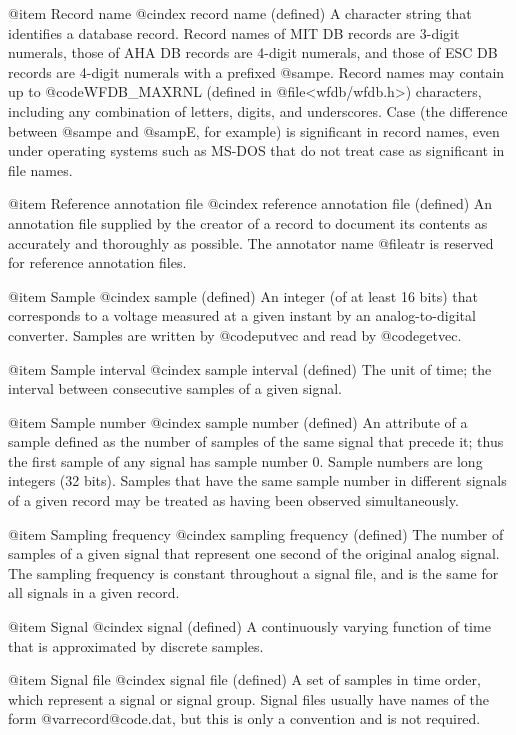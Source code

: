 {{{{{{{{@item Record name
@cindex record name (defined)
A character string that identifies a database record.  Record names of
MIT DB records are 3-digit numerals, those of AHA DB records are 4-digit
numerals, and those of ESC DB records are 4-digit numerals with a
prefixed @samp{e}.  Record names may contain up to @code{WFDB_MAXRNL}
(defined in @file{<wfdb/wfdb.h>}) characters, including any combination of
letters, digits, and underscores.  Case (the difference between @samp{e}
and @samp{E}, for example) is significant in record names, even under
operating systems such as MS-DOS that do not treat case as significant
in file names.

@item Reference annotation file
@cindex reference annotation file (defined)
An annotation file supplied by the creator of a record to document its
contents as accurately and thoroughly as possible.  The annotator name
@file{atr} is reserved for reference annotation files.

@item Sample
@cindex sample (defined)
An integer (of at least 16 bits) that corresponds to a voltage measured
at a given instant by an analog-to-digital converter.  Samples are
written by @code{putvec} and read by @code{getvec}.

@item Sample interval
@cindex sample interval (defined)
The unit of time;  the interval between consecutive samples of a given
signal.

@item Sample number
@cindex sample number (defined)
An attribute of a sample defined as the number of samples of the same
signal that precede it; thus the first sample of any signal has sample
number 0.  Sample numbers are long integers (32 bits).  Samples that
have the same sample number in different signals of a given record may
be treated as having been observed simultaneously.

@item Sampling frequency
@cindex sampling frequency (defined)
The number of samples of a given signal that represent one second of
the original analog signal.  The sampling frequency is constant
throughout a signal file, and is the same for all signals in a given
record.

@item Signal
@cindex signal (defined)
A continuously varying function of time that is approximated by
discrete samples.

@item Signal file
@cindex signal file (defined)
A set of samples in time order, which represent a signal or signal
group.  Signal files usually have names of the form @var{record}@code{.dat},
but this is only a convention and is not required.

}}}}}}}}
